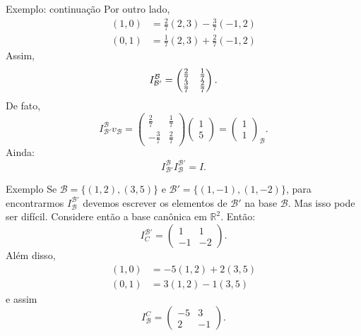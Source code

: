 \documentclass{beamer}
\begin{document}
\begin{darkframes}
\begin{frame}{Exemplo: continuação}
  Por outro lado, \vspace*{-0.5cm}
  \begin{align*}
    (1,0) & = \frac{2}{7}(2,3) - \frac{3}{7}(-1,2)\\
    (0,1) & = \frac{1}{7}(2,3) + \frac{2}{7}(-1,2)
  \end{align*}
  Assim,
  \begin{equation*}
    I_{{\mathcal{B}}'}^{\mathcal{B}} = \begin{pmatrix} \frac{2}{7} & \frac{1}{7}\\\-\frac{3}{7} & \frac{2}{7}\end{pmatrix}.
  \end{equation*}
  De fato,
  \begin{equation*}
    I_{{\mathcal{B}}'}^{\mathcal{B}}v_{\mathcal{B}} = \begin{pmatrix} \frac{2}{7} & \frac{1}{7}\\ -\frac{3}{7} & \frac{2}{7}\end{pmatrix} \begin{pmatrix} 1\\5\end{pmatrix} = \begin{pmatrix} 1\\1\end{pmatrix}_{\mathcal{B}}.
  \end{equation*}
  Ainda:
  \begin{equation*}
    I_{{\mathcal{B}}'}^{\mathcal{B}}I_{\mathcal{B}}^{{\mathcal{B}}'} = I.
  \end{equation*}
\end{frame}

\begin{frame}{Exemplo}
  Se ${\mathcal{B}} = \{ (1,2),(3,5)\}$ e ${\mathcal{B}}' = \{(1,-1),(1,-2)\}$, para encontrarmos $I_{\mathcal{B}}^{{\mathcal{B}}'}$ devemos escrever os elementos de ${\mathcal{B}}'$ na base ${\mathcal{B}}$. Mas isso pode ser difícil. Considere então a base canônica em ${\mathbb{R}}^2$. Então:
  \begin{equation*}
    I_C^{{\mathcal{B}}'} = \begin{pmatrix} 1 & 1\\-1 & -2\end{pmatrix}.
  \end{equation*}
  Além disso, \vspace*{-0.5cm}
  \begin{align*}
    (1,0) &= -5(1,2)+2(3,5)\\
    (0,1) &= 3(1,2)-1(3,5)
  \end{align*}
  \vspace*{-0.5cm} e assim
  \begin{equation*}
    I_{\mathcal{B}}^C = \begin{pmatrix} -5 & 3\\2 & -1\end{pmatrix}.
  \end{equation*}
\end{frame}


\end{darkframes}
\end{document}
